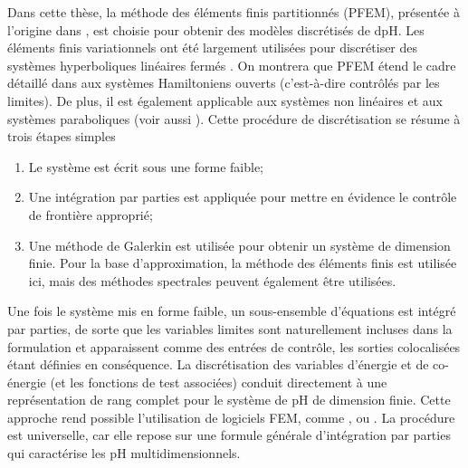 \vspace{.5cm}
Dans cette thèse, la méthode des éléments finis partitionnés (PFEM), présentée à l'origine dans \cite{cardoso2018pfem,cardoso2019partitioned}, est choisie pour obtenir des modèles discrétisés de dpH. Les éléments finis variationnels ont été largement utilisées pour discrétiser des systèmes hyperboliques linéaires fermés \cite{joly2003variational}. On montrera que PFEM étend le cadre détaillé dans \cite{joly2003variational} aux systèmes Hamiltoniens ouverts (c'est-à-dire contrôlés par les limites). De plus, il est également applicable aux systèmes non linéaires  et aux systèmes paraboliques  (voir aussi \cite{serhani2019modeling,serhani2019discretization}). Cette procédure de discrétisation se résume à trois étapes simples
\begin{enumerate}
\item Le système est écrit sous une forme faible;
\item Une intégration par parties est appliquée pour mettre en évidence le contrôle de frontière approprié;
\item Une méthode de Galerkin est utilisée pour obtenir un système de dimension finie. Pour la base d'approximation, la méthode des éléments finis est utilisée ici, mais des méthodes spectrales peuvent également être utilisées.
\end{enumerate}

Une fois le système mis en forme faible, un sous-ensemble d'équations est intégré par parties, de sorte que les variables limites sont naturellement incluses dans la formulation et apparaissent comme des entrées de contrôle, les sorties colocalisées étant définies en conséquence. La discrétisation des variables d'énergie et de co-énergie (et les fonctions de test associées) conduit directement à une représentation de rang complet pour le système de pH de dimension finie. Cette approche rend possible l'utilisation de logiciels FEM, comme \fenics \cite{logg2012}, ou \firedrake \cite{rathgeber2017firedrake}. La procédure est universelle, car elle repose sur une formule générale d'intégration par parties qui caractérise les pH multidimensionnels. \\

